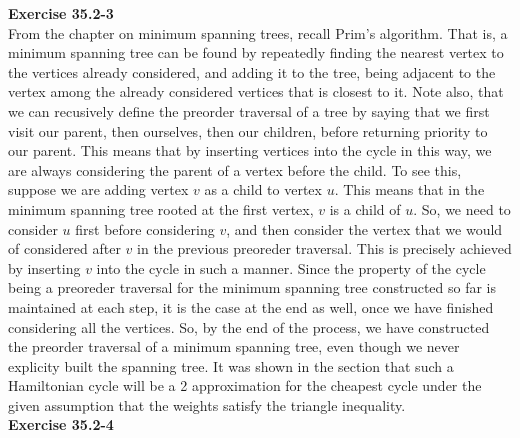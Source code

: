 \documentclass{article}
\begin{document}
\noindent\textbf{Exercise 35.2-3}\\

From the chapter on minimum spanning trees, recall Prim's algorithm. That is, a minimum spanning tree can be found by repeatedly finding the nearest vertex to the vertices already considered, and adding it to the tree, being adjacent to the vertex among the already considered vertices that is closest to it. Note also, that we can recusively define the preorder traversal of a tree by saying that we first visit our parent, then ourselves, then our children, before returning priority to our parent. This means that by inserting vertices into the cycle in this way, we are always considering the parent of a vertex before the child. To see this, suppose we are adding vertex $v$ as a child to vertex $u$. This means that in the minimum spanning tree rooted at the first vertex, $v$ is a child of $u$. So, we need to consider $u$ first before considering $v$, and then consider the vertex that we would of considered after $v$ in the previous preoreder traversal. This is precisely achieved by inserting $v$ into the cycle in such a manner. Since the property of the cycle being a preoreder traversal for the minimum spanning tree constructed so far is maintained at each step, it is the case at the end as well, once we have finished considering all the vertices.  So, by the end of the process, we have constructed the preorder traversal of a minimum spanning tree, even though we never explicity built the spanning tree. It was shown in the section that such a Hamiltonian cycle will be a 2 approximation for the cheapest cycle under the given assumption that the weights satisfy the triangle inequality.\\

\noindent\textbf{Exercise 35.2-4}\\
\end{document}
